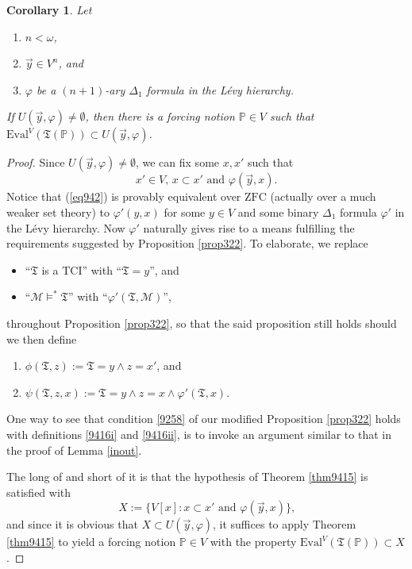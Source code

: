 \documentclass[12pt, twoside]{memoir}
\numberwithin{equation}{section}
\newtheorem{cor}[thm]{Corollary}
\theoremstyle{definition}
\theoremstyle{remark}
\theoremstyle{definition}
\theoremstyle{definition}
\theoremstyle{definition}
\theoremstyle{remark}
\begin{document}
\begin{cor}\label{cor9416}
Let 
\begin{enumerate}[label=(\alph*)]
    \item $n < \omega$,
    \item $\Vec{y} \in V^n$, and
    \item $\varphi$ be a $(n + 1)$-ary $\Delta_1$ formula in the L\'{e}vy hierarchy.
\end{enumerate}
If $U(\Vec{y}, \varphi) \neq \emptyset$, then there is a forcing notion $\mathbb{P} \in V$ such that $\mathrm{Eval}^V(\mathfrak{T}(\mathbb{P})) \subset U(\Vec{y}, \varphi)$. 
\end{cor}

\begin{proof}
Since $U(\Vec{y}, \varphi) \neq \emptyset$, we can fix some $x, x'$ such that 
\begin{equation}\label{eq942}
    x' \in V \text{, } x \subset x' \text{ and } \varphi (\Vec{y}, x) \text{.}
\end{equation}
Notice that (\ref{eq942}) is provably equivalent over $\mathrm{ZFC}$ (actually over a much weaker set theory) to $\varphi'(y, x)$ for some $y \in V$ and some binary $\Delta_1$ formula $\varphi'$ in the L\'{e}vy hierarchy. Now $\varphi'$ naturally gives rise to a means fulfilling the requirements suggested by Proposition \ref{prop322}. To elaborate, we replace 
\begin{itemize}
    \item ``$\mathfrak{T}$ is a TCI'' with ``$\mathfrak{T} = y$'', and
    \item ``$\mathcal{M} \models^* \mathfrak{T}$'' with ``$\varphi'(\mathfrak{T}, \mathcal{M})$'',
\end{itemize}
throughout Proposition \ref{prop322}, so that the said proposition still holds should we then define
\begin{enumerate}[label=(\roman*)]
    \item\label{9416i} $\phi(\mathfrak{T}, z) := \mathfrak{T} = y \wedge z = x'$, and
    \item\label{9416ii} $\psi(\mathfrak{T}, z, x) := \mathfrak{T} = y \wedge z = x \wedge \varphi'(\mathfrak{T}, x)$.
\end{enumerate}
One way to see that condition \ref{9258} of our modified Proposition \ref{prop322} holds with definitions \ref{9416i} and \ref{9416ii}, is to invoke an argument similar to that in the proof of Lemma \ref{inout}. 

The long of and short of it is that the hypothesis of Theorem \ref{thm9415} is satisfied with
\begin{equation*}
    X := \{V[x] : x \subset x' \text{ and } \varphi(\Vec{y}, x)\} \text{,}
\end{equation*}
and since it is obvious that $X \subset U(\Vec{y}, \varphi)$, it suffices to apply Theorem \ref{thm9415} to yield a forcing notion $\mathbb{P} \in V$ with the property $\mathrm{Eval}^V(\mathfrak{T}(\mathbb{P})) \subset X$.
\end{proof}
\end{document}
